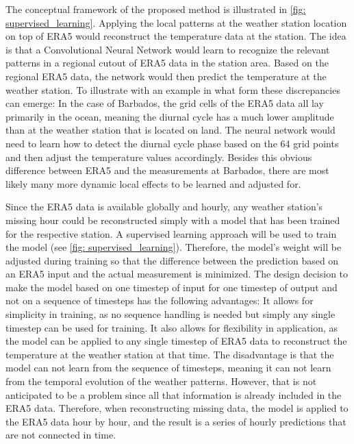 The conceptual framework of the proposed method is illustrated in \autoref{fig: supervised_learning}.
Applying the local patterns at the weather station location on top of ERA5 would reconstruct the temperature data at the station.
The idea is that a Convolutional Neural Network would learn to recognize the relevant patterns in a regional cutout of ERA5 data in the station area.
Based on the regional ERA5 data, the network would then predict the temperature at the weather station.
To illustrate with an example in what form these discrepancies can emerge:
In the case of Barbados, the grid cells of the ERA5 data all lay primarily in the ocean, meaning the diurnal cycle has a much lower amplitude than at the weather station that is located on land.
The neural network would need to learn how to detect the diurnal cycle phase based on the 64 grid points and then adjust the temperature values accordingly. Besides this obvious difference between ERA5 and the measurements at Barbados, there are most likely many more dynamic local effects to be learned and adjusted for.

Since the ERA5 data is available globally and hourly, any weather station's missing hour could be reconstructed simply with a model that has been trained for the respective station.
A supervised learning approach will be used to train the model (see \autoref{fig: supervised_learning}).
Therefore, the model's weight will be adjusted during training so that the difference between the prediction based on an ERA5 input and the actual measurement is minimized.
The design decision to make the model based on one timestep of input for one timestep of output and not on a sequence of timesteps has the following advantages: It allows for simplicity in training, as no sequence handling is needed but simply any single timestep can be used for training.
It also allows for flexibility in application, as the model can be applied to any single timestep of ERA5 data to reconstruct the temperature at the weather station at that time.
The disadvantage is that the model can not learn from the sequence of timesteps, meaning it can not learn from the temporal evolution of the weather patterns.
However, that is not anticipated to be a problem since all that information is already included in the ERA5 data.
Therefore, when reconstructing missing data, the model is applied to the ERA5 data hour by hour, and the result is a series of hourly predictions that are not connected in time.

